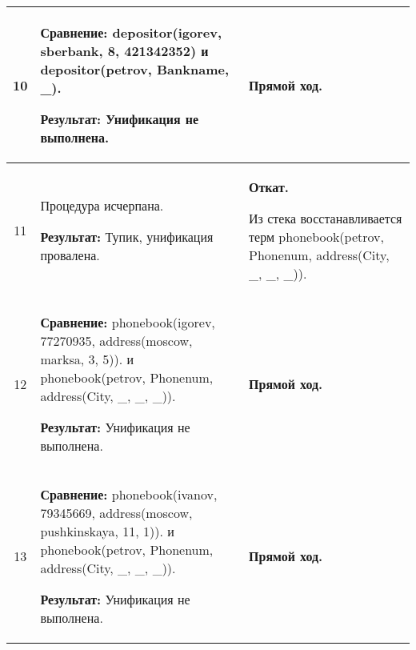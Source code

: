 \begin{longtable}{|c|p{}|p{}|}
    10
                       &
\textbf{Сравнение:} \newline
    depositor(igorev, sberbank, 8, 421342352)
    \newline и \newline
    depositor(petrov, Bankname, \_).
    \newline

    \textbf{Результат:} \newline
    Унификация не выполнена.
                       &
    \textbf{Прямой ход.}
                       \\ \hline

    11
                       &
    Процедура исчерпана.
    \newline

    \textbf{Результат:} \newline
    Тупик, унификация провалена.
                       &
    \textbf{Откат.}
    \newline

    Из стека восстанавливается терм \newline
    phonebook(petrov, Phonenum, address(City, \_, \_, \_)).
                       \\ \hline

    12
                       &
\textbf{Сравнение:} \newline
    phonebook(igorev, 77270935,
              address(moscow,    marksa,       3,  5)).
    \newline и \newline
    phonebook(petrov, Phonenum, address(City, \_, \_, \_)).
    \newline

    \textbf{Результат:} \newline
    Унификация не выполнена.
                       &
    \textbf{Прямой ход.}
                       \\ \hline

    13
                       &
\textbf{Сравнение:} \newline
    phonebook(ivanov, 79345669,
              address(moscow,    pushkinskaya, 11, 1)).
    \newline и \newline
    phonebook(petrov, Phonenum, address(City, \_, \_, \_)).
    \newline

    \textbf{Результат:} \newline
    Унификация не выполнена.
                       &
    \textbf{Прямой ход.}
                       \\ \hline


\end{longtable}
